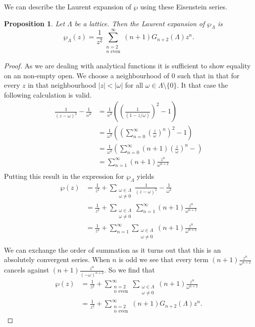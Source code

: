\documentclass[a4paper]{article}
\theoremstyle{theoremdd}
\newtheorem{proposition}[theorem]{Proposition}
\theoremstyle{definitiondd}
\theoremstyle{remarkdd}
\begin{document}
We can describe the Laurent expansion of $\wp$ using these Eisenstein series.
\begin{proposition}\label{prop:laurent_weierstrass}
  Let $\Lambda$ be a lattice. Then the Laurent expansion of $\wp_\Lambda$ is \[
	  \wp_\Lambda(z) = \frac{1}{z^2} \sum_{\substack{n = 2 \\ n \text{ even}}}^{\infty}(n+ 1) G_{n + 2}(\Lambda)z^{n}
  .\] 
\end{proposition}
\begin{proof}
	As we are dealing with analytical functions it is sufficient to show equality on an non-empty open. We choose a neighbourhood of 0 such that in that for every $z$ in that neighbourhood $|z| < |\omega|$ for all $\omega \in \Lambda \setminus \{ 0\} $. It that case the following calculation is valid. 
\begin{align*}
	\frac{1}{(z- \omega)^2} - \frac{1}{\omega^2} &= \frac{1}{\omega^2}\left( \left( \frac{1}{(1-z / \omega)} \right) ^2 - 1 \right)  \\
						     &= \frac{1}{\omega^2}\left( \left( \sum_{n = 0}^{\infty} \left(\frac{z}{\omega}\right)^{n} \right)^2 - 1  \right) \\
						     &= \frac{1}{\omega^2}\left( \sum_{n = 0}^{\infty} (n + 1)  \left( \frac{z}{\omega} \right) ^{n} - \right)  \\
						     &= \sum_{n = 1}^{\infty} (n + 1)  \frac{z^{n}}{\omega^{n+2}} \\
\end{align*}	
Putting this result in the expression for $\wp_\Lambda$ yields
\begin{align*}
	\wp(z) &= 
	\frac{1}{z^2} + \sum_{\substack{\omega \in \Lambda \\ \omega \ne 0 }} \frac{1}{(z - \omega)^2} - \frac{1}{\omega^2} \\
	       &=  \frac{1}{z^2} + \sum_{\substack{\omega \in \Lambda \\ \omega \ne 0}} \sum _{n = 1}^{\infty} (n + 1)  \frac{z^{n}}{\omega^{n+2}}\\
	       &= \frac{1}{z^2} + \sum_{n = 1}^{\infty}\sum_{\substack{\omega \in \Lambda \\ \omega \ne 0 }} (n + 1) \frac{z^{n}}{\omega^{n+2}} \\
\end{align*}
We can exchange the order of summation as it turns out that this is an absolutely convergent series. 
When $n$ is odd we see that every term $ (n + 1) \frac{z^{n}}{\omega^{n+2}}$ cancels against $(n + 1) \frac{z^{n}}{(-\omega)^{n+2}}$. 
So we find that 
\begin{align*}
	\wp(z) &= \frac{1}{z^2} + \sum_{\substack{n = 2\\ n \text{ even}}}^{\infty}\sum_{\substack{\omega \in \Lambda \\ \omega \ne 0 }} (n + 1) \frac{z^{n}}{\omega^{n+2}} \\
	       &=\frac{1}{z^2} + \sum_{\substack{n = 2 \\ n \text{ even}}}^{\infty} (n+1) G_{n + 2}(\Lambda) z^{n}
.\end{align*}
\end{proof}
\end{document}
